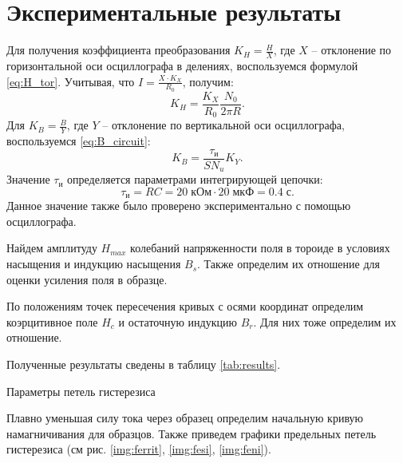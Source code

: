 \section*{Экспериментальные результаты}

Для получения коэффициента преобразования $K_H = \frac{H}{X}$, где $X$ -- отклонение по горизонтальной оси осциллографа в делениях, воспользуемся формулой \ref{eq:H_tor}. Учитывая, что $I = \frac{X \cdot K_X}{R_0}$, получим:
$$ K_H = \frac{K_X}{R_0} \frac{N_0}{2 \pi R}.$$
Для $K_B = \frac{B}{Y}$, где $Y$ -- отклонение по вертикальной оси осциллографа, воспользуемся \ref{eq:B_circuit}:
$$ K_B = \frac{\tau_{\text{и}}}{SN_u} K_Y.$$
Значение $\tau_{\text{и}}$ определяется параметрами интегрирующей цепочки:
$$ \tau_{\text{и}} = RC = 20 \; \text{кОм} \cdot 20 \; \text{мкФ} = 0.4 \; \text{с}. $$
Данное значение также было проверено экспериментально с помощью осциллографа.

Найдем амплитуду $H_{max}$ колебаний напряженности поля в тороиде в условиях насыщения и индукцию насыщения $B_s$. Также определим их отношение для оценки усиления поля в образце.

По положениям точек пересечения кривых с осями координат определим коэрцитивное поле $H_c$ и остаточную индукцию $B_r$. Для них тоже определим их отношение.

Полученные результаты сведены в таблицу \ref{tab:results}.

\begin{table}[H]
	\centering
	\footnotesize
	
	\caption{Параметры петель гистерезиса}
	\label{tab:results}
\end{table}

Плавно уменьшая силу тока через образец определим начальную кривую намагничивания для образцов. Также приведем графики предельных петель гистерезиса (см рис. \ref{img:ferrit}, \ref{img:fesi}, \ref{img:feni}).

